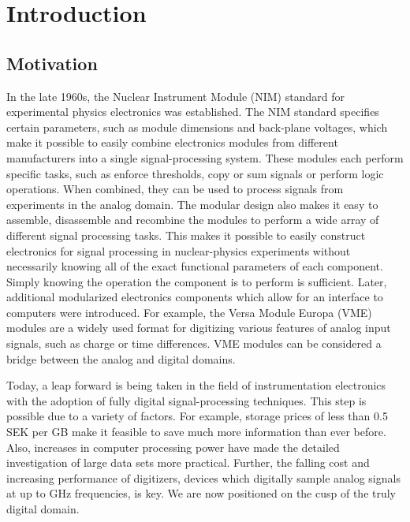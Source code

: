 \documentclass[main.tex]{subfiles}
\begin{document}
\chapter{Introduction}\label{ch:1}
\section{Motivation}
In the late 1960s, the Nuclear Instrument Module (NIM) standard for experimental physics electronics was established. The NIM standard specifies certain parameters, such as module dimensions and back-plane voltages, which make it possible to easily combine electronics modules from different manufacturers into a single signal-processing system. These modules each perform specific tasks, such as enforce thresholds, copy or sum signals or perform logic operations. When combined, they can be used to process signals from experiments in the analog domain. The modular design also makes it easy to assemble, disassemble and recombine the modules to perform a wide array of different signal processing tasks. 
This makes it possible to easily construct electronics for signal processing in nuclear-physics experiments without necessarily knowing all of the exact functional parameters of each component. Simply knowing the operation the component is to perform is sufficient. Later, additional modularized electronics components which allow for an interface to computers were introduced. For example, the Versa Module Europa (VME) modules are a widely used format for digitizing various features of analog input signals, such as charge or time differences. VME modules can be considered a bridge between the analog and digital domains.

Today, a leap forward is being taken in the field of instrumentation electronics with the adoption of fully digital signal-processing techniques. This step is possible due to a variety of factors. For example, storage prices of less than 0.5 SEK per GB make it feasible to save much more information than ever before. Also, increases in computer processing power have made the detailed investigation of large data sets more practical. Further, the falling cost and increasing performance of digitizers, devices which digitally sample analog signals at up to GHz frequencies, is key. We are now positioned on the cusp of the truly digital domain.
\end{document}
